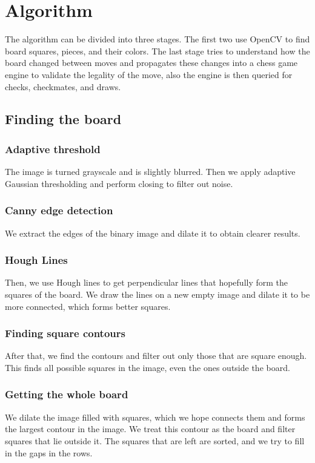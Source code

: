 \documentclass{article}
\begin{document}
\section{Algorithm}

The algorithm can be divided into three stages. The first two use OpenCV to find board squares, pieces, and their colors. The last stage tries to understand how the board changed between moves and propagates these changes into a chess game engine to validate the legality of the move, also the engine is then queried for checks, checkmates, and draws.

\subsection{Finding the board}

\subsubsection{Adaptive threshold}
The image is turned grayscale and is slightly blurred. Then we apply adaptive Gaussian thresholding and perform closing to filter out noise.

\subsubsection{Canny edge detection}
We extract the edges of the binary image and dilate it to obtain clearer results.

\subsubsection{Hough Lines}
Then, we use Hough lines to get perpendicular lines that hopefully form the squares of the board. We draw the lines on a new empty image and dilate it to be more connected, which forms better squares.

\subsubsection{Finding square contours}
After that, we find the contours and filter out only those that are square enough. This finds all possible squares in the image, even the ones outside the board.

\subsubsection{Getting the whole board}
We dilate the image filled with squares, which we hope connects them and forms the largest contour in the image. We treat this contour as the board and filter squares that lie outside it. The squares that are left are sorted, and we try to fill in the gaps in the rows.
\end{document}
